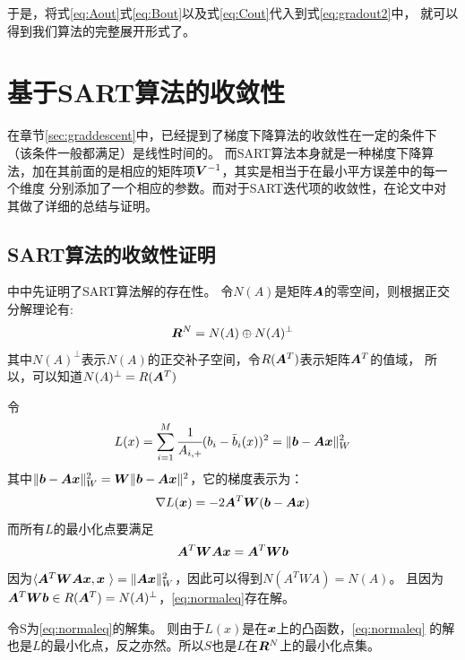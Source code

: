 于是，将式\eqref{eq:Aout}式\eqref{eq:Bout}以及式\eqref{eq:Cout}代入到式\eqref{eq:gradout2}中，
就可以得到我们算法的完整展开形式了。



\section{基于SART算法的收敛性}

在章节\ref{sec:graddescent}中，已经提到了梯度下降算法的收敛性在一定的条件下（该条件一般都满足）是线性时间的。
而SART算法本身就是一种梯度下降算法，加在其前面的是相应的矩阵项$\bm{V}^{-1}$，其实是相当于在最小平方误差中的每一个维度
分别添加了一个相应的参数。而对于SART迭代项的收敛性，在论文\cite{jiang2003convergence}中对其做了详细的总结与证明。

\subsection{SART算法的收敛性证明}
\cite{jiang2003convergence}中中先证明了SART算法解的存在性。
令$N(A)$是矩阵$\bm{A}$的零空间，则根据正交分解理论有:
\begin{equation*}
\bm{R}^N=N(A)\oplus N(A)^\perp
\end{equation*}
其中$N(A)^\perp$表示$N(A)$的正交补子空间，令$R(\bm{A}^T)$表示矩阵$\bm{A}^T$的值域，
所以，可以知道$N(A)^\perp=R(\bm{A}^T)$

令
\begin{equation*}
L(x)=\sum_{i=1}^M\cfrac{1}{A_{i,+}}(b_i-\bar{b}_i(x))^2=\lVert\bm{b}-\bm{A}\bm{ x}\rVert^2_W
\end{equation*}
其中$\lVert\bm{b}-\bm{A}\bm{ x}\rVert^2_W = \bm{W}\lVert\bm{b}-\bm{A}\bm{ x}\rVert^2$，它的梯度表示为：
\begin{equation*}
\nabla L(\bm{ x})=-2\bm{A}^T\bm{W}(\bm{b}-\bm{A}\bm{ x})
\end{equation*}
而所有$L$的最小化点要满足
\begin{equation}\label{eq:normaleq}
\bm{A}^T\bm{W}\bm{A}\bm{ x}=\bm{A}^T\bm{W}\bm{b}
\end{equation}
因为$\langle \bm{A}^T\bm{W}\bm{A}\bm{ x},\bm{ x}\ \rangle=\lVert\bm{A}\bm{ x}\rVert^2_W$，因此可以得到$N(A^TWA)=N(A)$。
且因为$\bm{A}^T\bm{W}\bm{b}\in R(\bm{A}^T) = N(A)^\perp$，\ref{eq:normaleq}存在解。

令S为\eqref{eq:normaleq}的解集。
则由于$L(x)$是在$\bm{ x}$上的凸函数，\eqref{eq:normaleq}
的解也是$L$的最小化点，反之亦然。所以$S$也是$L$在$\bm{R}^N$上的最小化点集。

